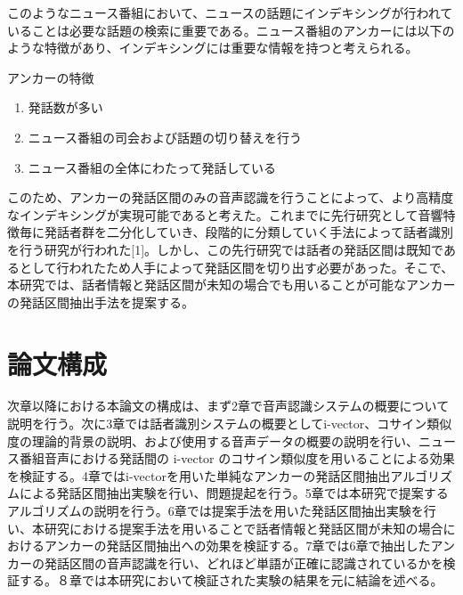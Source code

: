 このようなニュース番組において、ニュースの話題にインデキシングが行われていることは必要な話題の検索に重要である。ニュース番組のアンカーには以下のような特徴があり、インデキシングには重要な情報を持つと考えられる。\newline

アンカーの特徴
\begin{enumerate}
\item 発話数が多い
\item ニュース番組の司会および話題の切り替えを行う
\item ニュース番組の全体にわたって発話している
\end{enumerate}\par

このため、アンカーの発話区間のみの音声認識を行うことによって、より高精度なインデキシングが実現可能であると考えた。これまでに先行研究として音響特徴毎に発話者群を二分化していき、段階的に分類していく手法によって話者識別を行う研究が行われた[1]。しかし、この先行研究では話者の発話区間は既知であるとして行われたため人手によって発話区間を切り出す必要があった。そこで、本研究では、話者情報と発話区間が未知の場合でも用いることが可能なアンカーの発話区間抽出手法を提案する。

\section{論文構成}
次章以降における本論文の構成は、まず2章で音声認識システムの概要について説明を行う。次に3章では話者識別システムの概要としてi-vector、コサイン類似度の理論的背景の説明、および使用する音声データの概要の説明を行い、ニュース番組音声における発話間の i-vector のコサイン類似度を用いることによる効果を検証する。4章ではi-vectorを用いた単純なアンカーの発話区間抽出アルゴリズムによる発話区間抽出実験を行い、問題提起を行う。5章では本研究で提案するアルゴリズムの説明を行う。6章では提案手法を用いた発話区間抽出実験を行い、本研究における提案手法を用いることで話者情報と発話区間が未知の場合におけるアンカーの発話区間抽出への効果を検証する。7章では6章で抽出したアンカーの発話区間の音声認識を行い、どれほど単語が正確に認識されているかを検証する。８章では本研究において検証された実験の結果を元に結論を述べる。


